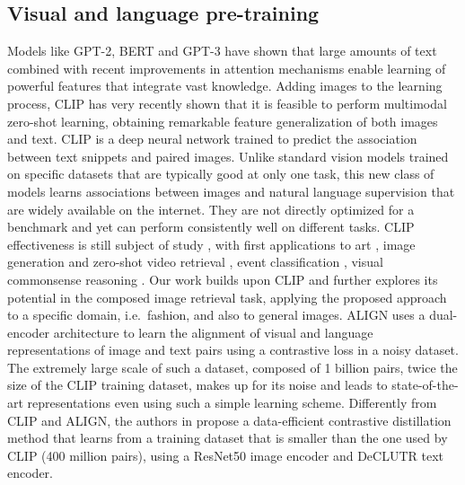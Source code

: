 \documentclass[acmlarge]{acmart}
\begin{document}
\subsection*{Visual and language pre-training}
Models like GPT-2, BERT \cite{devlin2019bert} and GPT-3 \cite{brown2020language} have shown that large amounts of text combined with recent improvements in attention mechanisms enable learning of powerful features that integrate vast knowledge. 
Adding images to the learning process, CLIP \cite{radford2021learning} has very recently shown that it is feasible to perform multimodal zero-shot learning, obtaining remarkable feature generalization of both images and text. 
CLIP is a deep neural network trained to predict the association between text snippets and paired images. Unlike standard vision models trained on specific datasets that are typically good at only one task, this new class of models learns associations between images and natural language supervision that are widely available on the internet.
They are not directly optimized for a benchmark and yet can perform consistently well on different tasks.
CLIP effectiveness is still subject of study \cite{agarwal2021evaluating}, with first applications to art \cite{conde2021clip}, image generation \cite{cimino2021generating} and zero-shot video retrieval \cite{fang2021clip2video}, event classification \cite{li2022clip}, visual commonsense reasoning \cite{wang2022cliptd}. 
Our work builds upon CLIP and further explores its potential in the composed image retrieval task, applying the proposed approach to a specific domain, i.e.~fashion, and also to general images.
ALIGN \cite{jia2021scaling} uses a  dual-encoder architecture to learn the alignment of visual and language representations of image and text pairs using a contrastive loss in a noisy dataset. The extremely large scale of such a dataset, composed of 1 billion pairs, twice the size of the CLIP training dataset, makes up for its noise and leads to state-of-the-art representations even using such a simple learning scheme.
Differently from CLIP and ALIGN, the authors in \cite{Cheng_2021_CVPR} propose a data-efficient contrastive distillation method that learns from a training dataset that is  smaller than the one used by CLIP (400 million pairs), using a ResNet50 image encoder and DeCLUTR text encoder.
\end{document}

